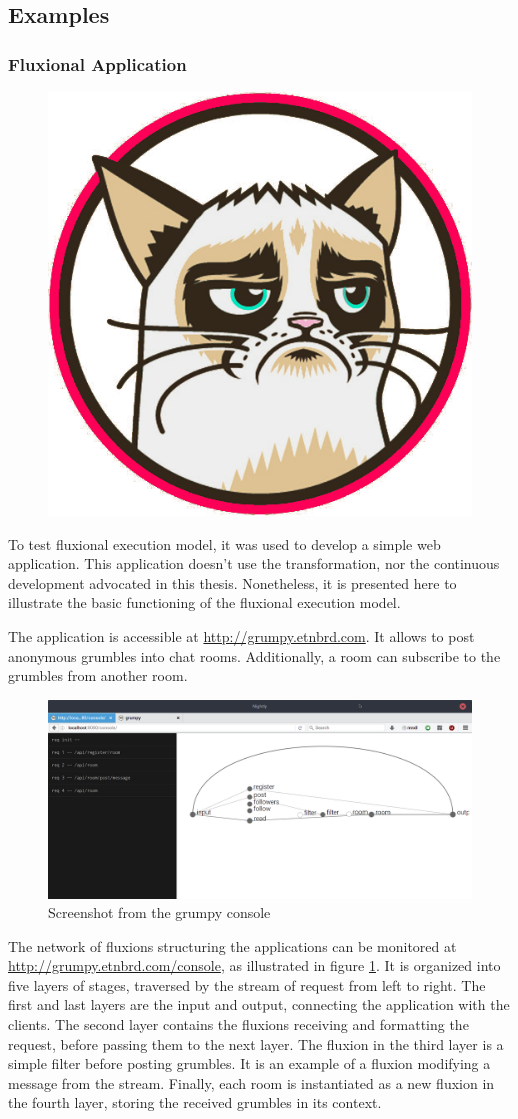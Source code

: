 \subsection{Examples} \label{chapter4:execution-models:examples}

\subsubsection{Fluxional Application}

\begin{figure}
  \centering
  \includegraphics[height=0.2\textwidth]{../resources/grumpy.png}
\end{figure}

To test fluxional execution model, it was used to develop a simple web application.
This application doesn't use the transformation, nor the continuous development advocated in this thesis.
Nonetheless, it is presented here to illustrate the basic functioning of the fluxional execution model.

The application is accessible at \url{http://grumpy.etnbrd.com}.
It allows to post anonymous grumbles into chat rooms.
Additionally, a room can subscribe to the grumbles from another room.

\begin{figure}
  \includegraphics[width=\textwidth]{../resources/grumpy-console.png}
  \caption{Screenshot from the grumpy console}
  \label{fig:grumpy-screenshot}
\end{figure}

The network of fluxions structuring the applications can be monitored at \url{http://grumpy.etnbrd.com/console}, as illustrated in figure \ref{fig:grumpy-screenshot}.
It is organized into five layers of stages, traversed by the stream of request from left to right.
The first and last layers are the input and output, connecting the application with the clients.
The second layer contains the fluxions receiving and formatting the request, before passing them to the next layer.
The fluxion in the third layer is a simple filter before posting grumbles.
It is an example of a fluxion modifying a message from the stream.
Finally, each room is instantiated as a new fluxion in the fourth layer, storing the received grumbles in its context.

